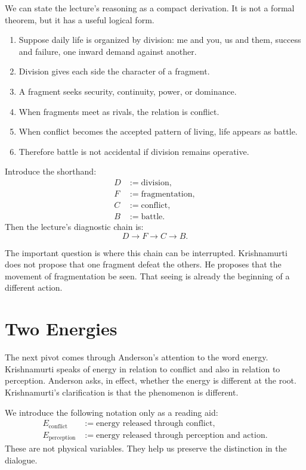 We can state the lecture's reasoning as a compact derivation. It is not a formal theorem, but it has a useful logical form.

\begin{enumerate}
\item Suppose daily life is organized by division: me and you, us and them, success and failure, one inward demand against another.
\item Division gives each side the character of a fragment.
\item A fragment seeks security, continuity, power, or dominance.
\item When fragments meet as rivals, the relation is conflict.
\item When conflict becomes the accepted pattern of living, life appears as battle.
\item Therefore battle is not accidental if division remains operative.
\end{enumerate}

Introduce the shorthand:
\begin{align}
D &:= \text{division},\\
F &:= \text{fragmentation},\\
C &:= \text{conflict},\\
B &:= \text{battle}.
\end{align}
Then the lecture's diagnostic chain is:
\begin{equation}
D \longrightarrow F \longrightarrow C \longrightarrow B.
\end{equation}

The important question is where this chain can be interrupted. Krishnamurti does not propose that one fragment defeat the others. He proposes that the movement of fragmentation be seen. That seeing is already the beginning of a different action.

\section{Two Energies}

The next pivot comes through Anderson's attention to the word energy. Krishnamurti speaks of energy in relation to conflict and also in relation to perception. Anderson asks, in effect, whether the energy is different at the root. Krishnamurti's clarification is that the phenomenon is different.

We introduce the following notation only as a reading aid:
\begin{align}
E_{\mathrm{conflict}} &:= \text{energy released through conflict},\\
E_{\mathrm{perception}} &:= \text{energy released through perception and action}.
\end{align}
These are not physical variables. They help us preserve the distinction in the dialogue.

